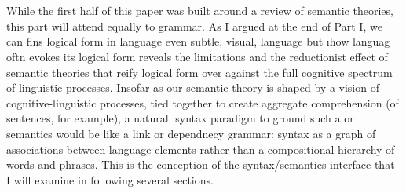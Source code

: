 \part{}
While the first half of this paper was built around a 
review of semantic theories, this part will 
attend equally to grammar.  As I argued at the end of 
Part I,  we can fins logical form in language 
\mdash{} even subtle, visual,  language \mdash{} but 
\i{how} languag oftn evokes its logical form reveals 
the limitations and the reductionist effect of semantic 
theories that reify logical form over against the 
full cognitive spectrum of linguistic processes.  
Insofar as our semantic theory is shaped by 
a vision of cognitive-linguistic processes, 
tied together to create aggregate comprehension 
(of sentences, for example), a natural 
\i{syntax} paradigm to ground such a 
 or  semantics would 
be like a link or dependnecy grammar: syntax as 
a graph of associations between language elements 
rather than a compositional hierarchy of words and 
phrases.  This is the conception of the syntax/semantics 
interface that I will examine in following 
several sections.
